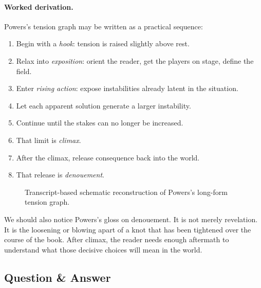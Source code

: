 \paragraph{Worked derivation.} Powers's tension graph may be written as a practical sequence:
\begin{enumerate}
\item Begin with a \emph{hook}: tension is raised slightly above rest.
\item Relax into \emph{exposition}: orient the reader, get the players on stage, define the field.
\item Enter \emph{rising action}: expose instabilities already latent in the situation.
\item Let each apparent solution generate a larger instability.
\item Continue until the stakes can no longer be increased.
\item That limit is \emph{climax}.
\item After the climax, release consequence back into the world.
\item That release is \emph{denouement}.
\end{enumerate}

\begin{figure}[h]
\centering
{}
\caption{Transcript-based schematic reconstruction of Powers's long-form tension graph.}
\end{figure}

We should also notice Powers's gloss on denouement. It is not merely revelation. It is the loosening or blowing apart of a knot that has been tightened over the course of the book. After climax, the reader needs enough aftermath to understand what those decisive choices will mean in the world.

\subsection{Question \& Answer}

